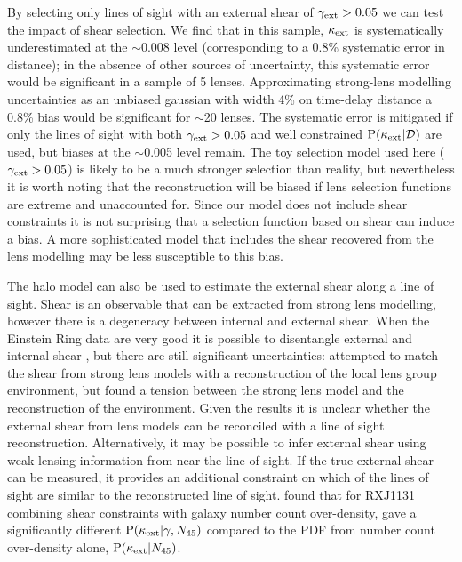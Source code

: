 \documentclass[useAMS,usenatbib]{mn2e}
\begin{document}
By selecting only lines of sight with an external shear of $\gamma_{\rm ext}>0.05$ we
can test the impact of shear selection. We find that in this sample, $\kappa_{\rm ext}$
is systematically underestimated at the $\sim$0.008 level (corresponding to a
0.8\% systematic error in distance); in the absence of other sources of uncertainty, this
systematic error would be significant in a sample of 5 lenses. Approximating strong-lens
modelling uncertainties as an unbiased gaussian with width 4\% on time-delay distance a 0.8\% bias would be
significant for $\sim$20 lenses. 
The systematic error is mitigated if only
the lines of sight with both $\gamma_{\rm ext}>0.05$ and well constrained ${\rm P}(\kappa_{\rm ext}|{\mathcal{D}})$ are
used, but biases at the $\sim$0.005 level remain. The
toy selection model used here ($\gamma_{\rm ext}>0.05$) is likely to be a much
stronger selection than reality, but nevertheless it is worth noting that the
reconstruction \proceedure will be biased if lens selection functions are
extreme and unaccounted for. Since our model does not
include shear constraints it is not surprising that a selection function based on shear
can induce a bias. A more sophisticated model that includes the shear
recovered from the lens modelling may be less susceptible to this bias.

The halo model can also be used to estimate the external shear
along a line of sight. Shear is an observable that can be extracted from
strong lens modelling, however there is a degeneracy between internal and
external shear. When the Einstein Ring data are very good it is possible to
disentangle external and internal shear \citep[\eg][]{SuyuEtal2010}, but there are
still significant uncertainties: \citet{WongEtal2011} attempted to match the
shear from strong lens models with a reconstruction of the local lens group
environment, but found a tension between the strong lens model and the
reconstruction of the environment. Given the \citet{WongEtal2011} results
it is unclear whether the external shear from lens models can be
reconciled with a line of sight reconstruction. Alternatively, it may be possible 
to infer external shear using weak lensing information from near the line of sight. 
If the true external shear can be
measured, it provides an additional constraint on which of the \MS lines of
sight are similar to the reconstructed line of sight. \citet{SuyuEtal2012}
found that for RXJ1131 combining shear constraints with galaxy number count
over-density, gave a significantly different ${\rm P}(\kappa_{\rm ext}|\gamma,N_{45})$
compared to the PDF from number count over-density alone,
${\rm P}(\kappa_{\rm ext}|N_{45})$.
\end{document}
